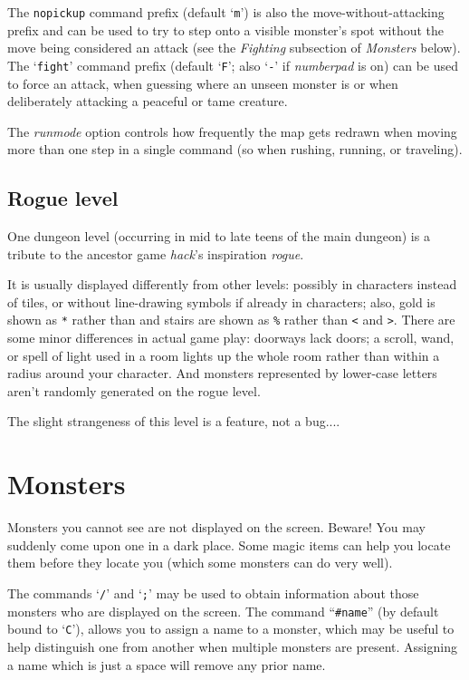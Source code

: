 \documentclass[titlepage]{article}
\begin{document}
The \texttt{nopickup} command prefix (default `\texttt{m}') is
also the move-without-attacking prefix and can be used to try to step
onto a visible monster's spot without the move being considered an attack
(see the \textit{Fighting} subsection of \textit{Monsters} below).
The `\texttt{fight}' command prefix (default `\texttt{F}';
also `\texttt{-}' if
\textit{number\textunderscore pad}
is on) can be used to force an attack, when guessing where an unseen
monster is or when deliberately attacking a peaceful or tame creature.

The
\textit{run\textunderscore mode}
option controls how frequently the map gets redrawn when moving more
than one step in a single command (so when rushing, running, or traveling).

\subsection*{Rogue level}

One dungeon level (occurring in mid to late teens of the main dungeon)
is a tribute to the ancestor game \textit{hack}'s inspiration \textit{rogue}.

It is usually displayed differently from other levels: possibly in
characters instead of tiles, or without line-drawing symbols if already
in characters; also, gold is shown as \texttt{*} rather than \texttt{\textdollar}
and stairs are shown as \texttt{\%} rather than \texttt{<} and \texttt{>}.
There are some minor differences in actual game play: doorways lack
doors; a scroll, wand, or spell of light used in a room lights up the
whole room rather than within a radius around your character.
And monsters represented by lower-case letters aren't randomly
generated on the rogue level.

The slight strangeness of this level is a feature, not a bug....

\section{Monsters}

Monsters you cannot see are not displayed on the screen.  Beware!
You may suddenly come upon one in a dark place.  Some magic items can
help you locate them before they locate you (which some monsters can do
very well).

The commands `\texttt{/}' and `\texttt{;}' may be used to obtain information
about those
monsters who are displayed on the screen.  The command ``\texttt{\#name}''
(by default bound to `\texttt{C}'), allows you
to assign a name to a monster, which may be useful to help distinguish
one from another when multiple monsters are present.  Assigning a name
which is just a space will remove any prior name.
\end{document}
